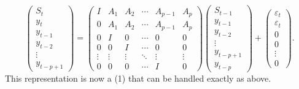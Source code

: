 \documentclass[12pt,fleqn]{article}
\newcommand{\vep}{\varepsilon}
\begin{document}
\begin{equation*}
  \begin{pmatrix}
    S_t \\ y_t \\ y_{t-1} \\ y_{t-2} \\ \vdots \\ y_{t-p+1}
  \end{pmatrix}
  =
  \begin{pmatrix}
    I & A_1 & A_2 & \cdots & A_{p-1} & A_p \\
    0 & A_1 & A_2 & \cdots & A_{p-1} & A_p \\
    0 & I   & 0 & \cdots & 0 & 0 \\
    0 & 0   & I & \cdots & 0 & 0 \\
    \vdots & \vdots & \vdots & \ddots & \vdots & \vdots \\
    0 & 0 & 0 & \cdots & I & 0
  \end{pmatrix}
  \begin{pmatrix}
    S_{t-1}  \\ y_{t-1} \\ y_{t-2} \\ \vdots \\ y_{t-p+1} \\ y_{t-p}
  \end{pmatrix}
  +
  \begin{pmatrix}
    \vep_t \\ \vep_t \\ 0 \\ 0 \\ \vdots \\ 0
  \end{pmatrix}.
\end{equation*}
This representation is now a \VAR(1) that can be handled exactly as above.
\end{document}
